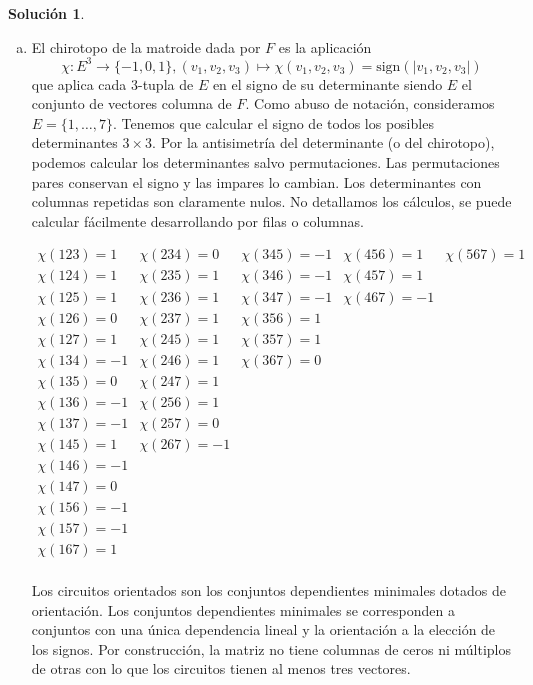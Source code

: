 \documentclass[10pt]{article}
\theoremstyle{definition}
\newtheorem*{sol}{Solución}
\begin{document}
\begin{sol}\leavevmode
\begin{enumerate}[(a)]
\item El chirotopo de la matroide dada por $F$ es la aplicación $$\chi : E^3\longrightarrow \{-1,0,1\}, (v_1,v_2,v_3)\longmapsto \chi(v_1,v_2,v_3)=\text{sign}(|v_1,v_2, v_3|)$$
que aplica cada $3$-tupla de $E$ en el signo de su determinante siendo $E$ el conjunto de vectores columna de $F$. Como abuso de notación, consideramos $E=\{1,\ldots, 7\}$. Tenemos que calcular el signo de todos los posibles determinantes $3\times 3$. Por la antisimetría del determinante (o del chirotopo), podemos calcular los determinantes salvo permutaciones. Las permutaciones pares conservan el signo y las impares lo cambian. Los determinantes con columnas repetidas son claramente nulos. No detallamos los cálculos, se puede calcular fácilmente desarrollando por filas o columnas.

$$\begin{array}{l|l|l|l|l}
\chi(123)=1 & \chi(234)=0 & \chi(345)=-1 & \chi(456)=1 & \chi(567)=1\\
\chi(124)=1 & \chi(235)=1 & \chi(346)=-1 & \chi(457)=1 &\\
\chi(125)=1 & \chi(236)=1 & \chi(347)=-1 & \chi(467)=-1& \\
\chi(126)=0 & \chi(237)=1 & \chi(356)=1 & & \\
\chi(127)=1 & \chi(245)=1 &\chi(357)=1 & &\\
\chi(134)=-1 & \chi(246)=1 &\chi(367)=0 & &\\
\chi(135)=0 & \chi(247)=1& & &\\
\chi(136)=-1 & \chi(256)=1 & & &\\
\chi(137)=-1 & \chi(257)=0 & & &\\
\chi(145)=1 &\chi(267)=-1 & & &\\ 
\chi(146)=-1 & & & &\\
\chi(147)=0 & & & &\\
\chi(156)=-1 & & & &\\
\chi(157)=-1 & & & &\\
\chi(167)=1 & & & &\\
\end{array}$$

Los circuitos orientados son los conjuntos dependientes minimales dotados de orientación. Los conjuntos dependientes minimales se corresponden a conjuntos con una única dependencia lineal y la orientación a la elección de los signos. Por construcción, la matriz no tiene columnas de ceros ni múltiplos de otras con lo que los circuitos tienen al menos tres vectores.


\end{enumerate}
\end{sol}
\end{document}
